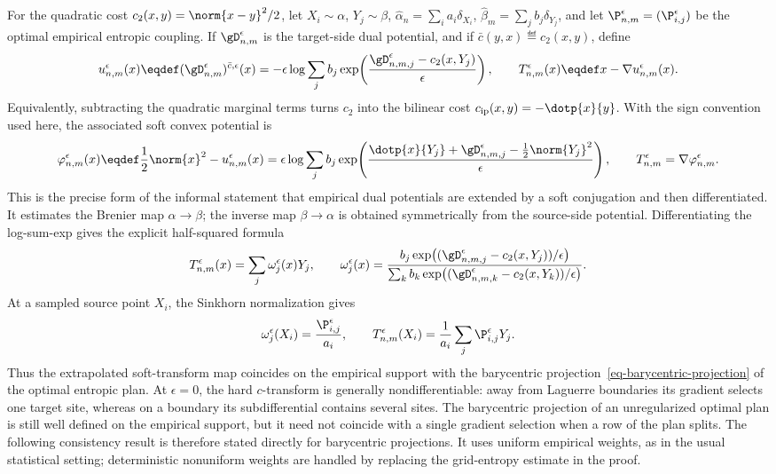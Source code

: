 For the quadratic cost \(c_2(x,y)=\norm{x-y}^2/2\), let \(X_i\sim\alpha\), \(Y_j\sim\beta\), \(\hat\alpha_n=\sum_i a_i\delta_{X_i}\), \(\hat\beta_m=\sum_j b_j\delta_{Y_j}\), and let \(\P_{n,m}^\epsilon=(\P_{i,j}^\epsilon)\) be the optimal empirical entropic coupling. If \(\gD_{n,m}^\epsilon\) is the target-side dual potential, and if \(\bar c(y,x)\eqdef c_2(x,y)\), define
\[
	u_{n,m}^\epsilon(x)
	\eqdef
	(\gD_{n,m}^\epsilon)^{\bar c,\epsilon}(x)
	=
	-\epsilon\log\sum_j b_j
	\exp\!\left(\frac{\gD_{n,m,j}^\epsilon-c_2(x,Y_j)}{\epsilon}\right),
	\qquad
	T_{n,m}^\epsilon(x)\eqdef x-\nabla u_{n,m}^\epsilon(x).
\]
Equivalently, subtracting the quadratic marginal terms turns \(c_2\) into the bilinear cost \(c_{\rm ip}(x,y)=-\dotp{x}{y}\). With the sign convention used here, the associated soft convex potential is
\[
	\varphi_{n,m}^\epsilon(x)
	\eqdef
	\frac12\norm{x}^2-u_{n,m}^\epsilon(x)
	=
	\epsilon\log\sum_j b_j
	\exp\!\left(
		\frac{\dotp{x}{Y_j}+\gD_{n,m,j}^\epsilon-\frac12\norm{Y_j}^2}{\epsilon}
	\right),
	\qquad
	T_{n,m}^\epsilon=\nabla\varphi_{n,m}^\epsilon.
\]
This is the precise form of the informal statement that empirical dual potentials are extended by a soft conjugation and then differentiated. It estimates the Brenier map \(\alpha\to\beta\); the inverse map \(\beta\to\alpha\) is obtained symmetrically from the source-side potential. Differentiating the log-sum-exp gives the explicit half-squared formula
\begin{equation}\label{eq-empirical-entropic-map-barycentric}
	T_{n,m}^\epsilon(x)
	=
	\sum_j \omega_j^\epsilon(x)Y_j,
	\qquad
	\omega_j^\epsilon(x)
	=
	\frac{
		b_j\exp\!\left((\gD_{n,m,j}^\epsilon-c_2(x,Y_j))/\epsilon\right)
	}{
		\sum_k b_k\exp\!\left((\gD_{n,m,k}^\epsilon-c_2(x,Y_k))/\epsilon\right)
	}.
\end{equation}
At a sampled source point \(X_i\), the Sinkhorn normalization gives
\[
	\omega_j^\epsilon(X_i)=\frac{\P_{i,j}^\epsilon}{a_i},
	\qquad
	T_{n,m}^\epsilon(X_i)
	=
	\frac1{a_i}\sum_j \P_{i,j}^\epsilon Y_j.
\]
Thus the extrapolated soft-transform map coincides on the empirical support with the barycentric projection~\eqref{eq-barycentric-projection} of the optimal entropic plan. At \(\epsilon=0\), the hard \(c\)-transform is generally nondifferentiable: away from Laguerre boundaries its gradient selects one target site, whereas on a boundary its subdifferential contains several sites. The barycentric projection of an unregularized optimal plan is still well defined on the empirical support, but it need not coincide with a single gradient selection when a row of the plan splits. The following consistency result is therefore stated directly for barycentric projections. It uses uniform empirical weights, as in the usual statistical setting; deterministic nonuniform weights are handled by replacing the grid-entropy estimate in the proof.

